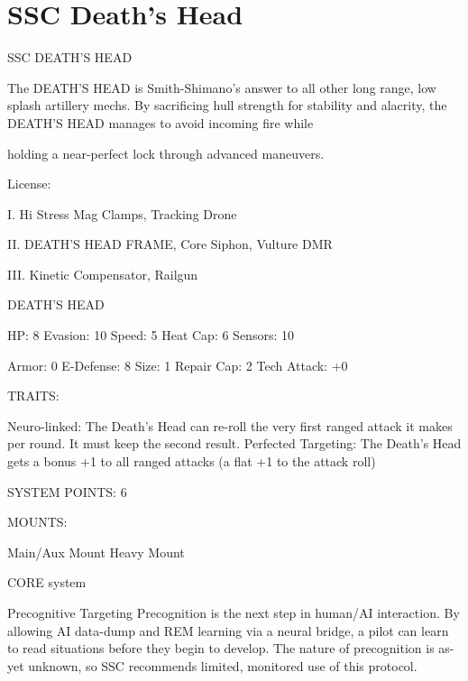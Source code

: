 \section{SSC Death's Head}

                                         SSC DEATH’S HEAD

The DEATH’S HEAD is Smith-Shimano’s answer to all other long range, low splash artillery mechs. By
sacrificing hull strength for stability and alacrity, the DEATH’S HEAD manages to avoid incoming fire while

holding a near-perfect lock through advanced maneuvers.

                                                    License:

I. Hi Stress Mag Clamps, Tracking Drone

II. DEATH’S HEAD FRAME, Core Siphon, Vulture DMR

III. Kinetic Compensator, Railgun


                                               DEATH’S HEAD

  HP: 8           Evasion: 10                           Speed: 5            Heat Cap: 6        Sensors: 10

  Armor: 0        E-Defense: 8                          Size: 1             Repair Cap: 2      Tech Attack:
                                                                                               +0

                                                     TRAITS:

  Neuro-linked: The Death’s Head can re-roll the very first ranged attack it makes per round. It must keep
  the second result.
  Perfected Targeting: The Death’s Head gets a bonus +1 to all ranged attacks (a flat +1 to the attack
  roll)

                                              SYSTEM POINTS: 6

                                                    MOUNTS:

  Main/Aux Mount                     Heavy Mount

                                                  CORE system




                                                 Precognitive Targeting
  Precognition is the next step in human/AI interaction. By allowing AI data-dump and REM learning via a
  neural bridge, a pilot can learn to read situations before they begin to develop. The nature of
  precognition is as-yet unknown, so SSC recommends limited, monitored use of this protocol.


